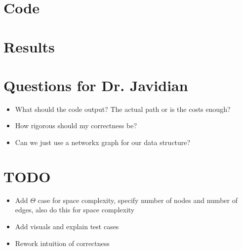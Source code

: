 \documentclass{article}
\begin{document}
\section{Code}

\section{Results}

\section{Questions for Dr. Javidian}
\begin{itemize}
    \item What should the code output? The actual path or is the costs enough?
    \item How rigorous should my correctness be?
    \item Can we just use a networkx graph for our data structure?
\end{itemize}

\section{TODO}
\begin{itemize}
    \item Add $\Theta$ case for space complexity, specify number of nodes and number of edges, also do this for space complexity
    \item Add visuals and explain test cases
    \item Rework intuition of correctness
\end{itemize}
\end{document}
